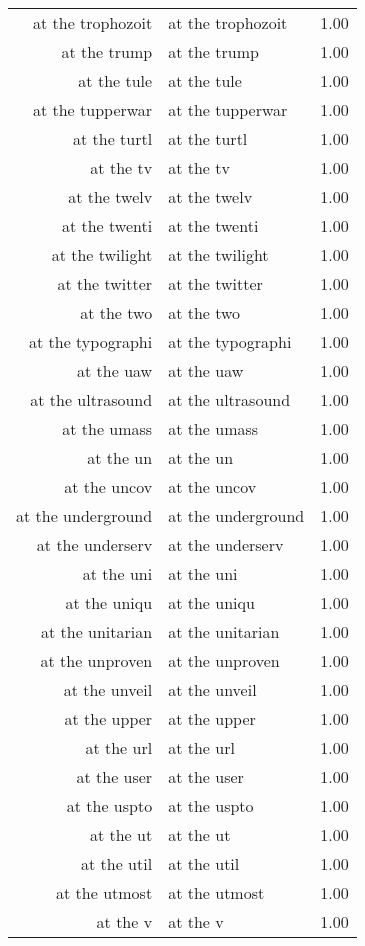 \begin{table}[ht]
\begin{tabular}{rlr}
  at the trophozoit & at the trophozoit & 1.00 \\ 
  at the trump & at the trump & 1.00 \\ 
  at the tule & at the tule & 1.00 \\ 
  at the tupperwar & at the tupperwar & 1.00 \\ 
  at the turtl & at the turtl & 1.00 \\ 
  at the tv & at the tv & 1.00 \\ 
  at the twelv & at the twelv & 1.00 \\ 
  at the twenti & at the twenti & 1.00 \\ 
  at the twilight & at the twilight & 1.00 \\ 
  at the twitter & at the twitter & 1.00 \\ 
  at the two & at the two & 1.00 \\ 
  at the typographi & at the typographi & 1.00 \\ 
  at the uaw & at the uaw & 1.00 \\ 
  at the ultrasound & at the ultrasound & 1.00 \\ 
  at the umass & at the umass & 1.00 \\ 
  at the un & at the un & 1.00 \\ 
  at the uncov & at the uncov & 1.00 \\ 
  at the underground & at the underground & 1.00 \\ 
  at the underserv & at the underserv & 1.00 \\ 
  at the uni & at the uni & 1.00 \\ 
  at the uniqu & at the uniqu & 1.00 \\ 
  at the unitarian & at the unitarian & 1.00 \\ 
  at the unproven & at the unproven & 1.00 \\ 
  at the unveil & at the unveil & 1.00 \\ 
  at the upper & at the upper & 1.00 \\ 
  at the url & at the url & 1.00 \\ 
  at the user & at the user & 1.00 \\ 
  at the uspto & at the uspto & 1.00 \\ 
  at the ut & at the ut & 1.00 \\ 
  at the util & at the util & 1.00 \\ 
  at the utmost & at the utmost & 1.00 \\ 
  at the v & at the v & 1.00 \\ 

\end{tabular}
\end{table}
